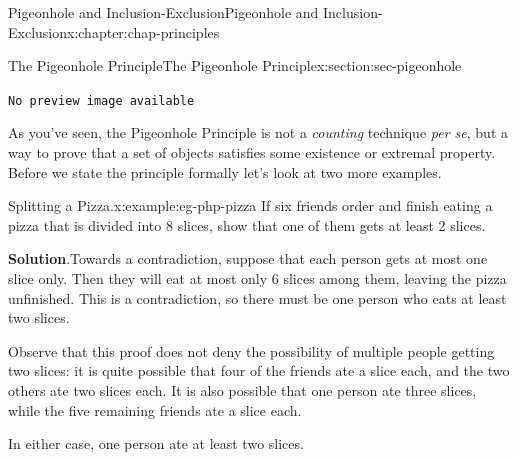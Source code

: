 \documentclass[oneside,10pt,]{book}
\newcommand{\blocktitlefont}{\relax}
\newcommand{\mono}[1]{\texttt{#1}}
\numberwithin{equation}{section}
\newlength{\qrsize}
\newlength{\previewwidth}
\begin{document}
\begin{chapterptx}{Pigeonhole and Inclusion-Exclusion}{}{Pigeonhole and Inclusion-Exclusion}{}{}{x:chapter:chap-principles}
\begin{sectionptx}{The Pigeonhole Principle}{}{The Pigeonhole Principle}{}{}{x:section:sec-pigeonhole}
\begin{sidebyside}{1}{0.1}{0.1}{0}
\begin{sbspanel}{0.8}
\begin{tcbraster}[raster columns=2, raster column skip=1pt, raster halign=center, raster force size=false, raster left skip=0pt, raster right skip=0pt]
\begin{tcolorbox}[previewstyle, width=\previewwidth]%
\mono{No preview image available}%
\end{tcolorbox}%
\begin{tcolorbox}[qrstyle]%
{\hypersetup{urlcolor=black}}%
\end{tcolorbox}%
\end{tcbraster}%
\end{sbspanel}%
\end{sidebyside}%
\par
As you've seen, the Pigeonhole Principle is not a \emph{counting} technique \emph{per se}, but a way to prove that a set of objects satisfies some existence or extremal property. Before we state the principle formally let's look at two more examples.%
\begin{example}{Splitting a Pizza.}{x:example:eg-php-pizza}%
If six friends order and finish eating a pizza that is divided into 8 slices, show that one of them gets at least 2 slices.%
\par\smallskip%
\noindent\textbf{\blocktitlefont Solution}.\hypertarget{g:solution:id529455}{}\quad{}Towards a contradiction, suppose that each person gets at most one slice only. Then they will eat at most only 6 slices among them, leaving the pizza unfinished. This is a contradiction, so there must be one person who eats at least two slices.%
\par
Observe that this proof does not deny the possibility of multiple people getting two slices: it is quite possible that four of the friends ate a slice each, and the two others ate two slices each. It is also possible that one person ate three slices, while the five remaining friends ate a slice each.%
\par
In either case, one person ate at least two slices.%
\end{example}
%
\begin{sidebyside}{1}{0.325}{0.325}{0}%
\begin{sbspanel}{0.35}%
\end{sbspanel}
\end{sidebyside}
\end{sectionptx}
\end{chapterptx}
\end{document}
